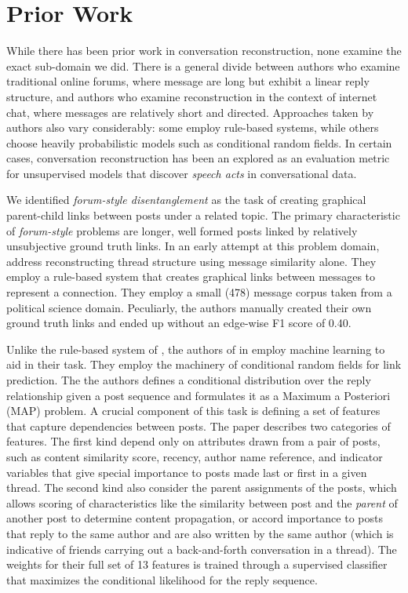 \documentclass[10pt]{article}
\begin{document}
\section{Prior Work}
\label{sec:prior_work}
While there has been prior work in conversation reconstruction, none examine
the exact sub-domain we did. There is a general divide between authors
who examine traditional online forums, where message are long but exhibit a linear
reply structure, and authors who examine reconstruction in the context of internet chat, 
where messages are relatively short and directed. Approaches taken by authors also vary considerably:
some employ rule-based systems, while others choose heavily probabilistic models such as conditional
random fields. In certain cases, conversation reconstruction has been an explored as an evaluation metric 
for unsupervised models that discover \textit{speech acts} in conversational data.

We identified \textit{forum-style disentanglement} as the task of creating 
graphical parent-child links between posts under a related topic. The primary characteristic 
of \textit{forum-style} problems are longer, well formed posts 
linked by relatively unsubjective ground truth links. In an early
attempt at this problem domain, \cite{Wang2008a} address reconstructing
thread structure using message similarity alone. They employ a rule-based
system that creates graphical links between messages to represent a connection.
They employ a small (478) message corpus taken from a political science domain. 
Peculiarly, the authors manually created their own ground truth links and ended
up without an edge-wise F1 score of 0.40.

Unlike the rule-based system of \cite{Wang2008a}, the authors of 
in \cite{Wang2011a} employ machine learning to aid in their task. They employ
the machinery of conditional random fields for link prediction.
The the authors defines a conditional distribution over the reply
relationship given a post sequence and formulates it as a Maximum a Posteriori
(MAP) problem. A crucial component of this task is defining a set of features
that capture dependencies between posts. The paper describes two categories of
features. The first kind depend only on attributes drawn from a pair
of posts, such as content similarity score, recency, author name reference, and
indicator variables that give special importance to posts made last or first in
a given thread. The second kind also consider the parent assignments of
the posts, which allows scoring of characteristics like the
similarity between  post and the \emph{parent} of another post to determine
content propagation, or accord importance to posts that reply to the same author
and are also written by the same author (which is indicative of friends carrying
out a back-and-forth conversation in a thread). The weights for their full set of
13 features is trained through a supervised classifier that maximizes the
conditional likelihood for the reply sequence.
\end{document}
